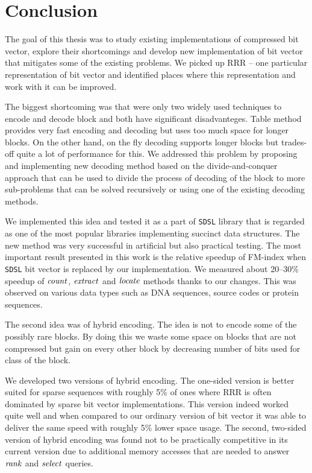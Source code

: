 \chapter*{Conclusion}  %

The goal of this thesis was to study existing implementations of compressed
bit vector, explore their shortcomings and develop new implementation of bit
vector that mitigates some of the existing problems. We picked up RRR -- one
particular representation of bit vector and identified places where this
representation and work with it can be improved. 

The biggest shortcoming was that were only two widely used techniques to
encode and decode block and both have significant disadvanteges. Table method
provides very fast encoding and decoding but uses too much space for longer
blocks. On the other hand, on the fly decoding supports longer blocks but
trades-off quite a lot of performance for this. We addressed this problem by
proposing and implementing new decoding method based on the divide-and-conquer
approach that can be used to divide the process of decoding of the block to more
sub-problems that can be solved recursively or using one of the existing decoding
methods.

We implemented this idea and tested it as a part of \texttt{SDSL} library that is
regarded as one of the most popular libraries implementing succinct data structures.
The new method was very successful in artificial but also practical testing. The most
important result presented in this work is the relative speedup of FM-index when
\texttt{SDSL} bit vector is replaced by our implementation. We measured about 20--30\%
speedup of $\mathit{count}$, $\mathit{extract}$ and $\mathit{locate}$ methods thanks to our changes. This
was observed on various data types such as DNA sequences, source codes or protein sequences.

The second idea was of hybrid encoding. The idea is not to encode some of the possibly rare
blocks. By doing this we waste some space on blocks that are not compressed but gain
on every other block by decreasing number of bits used for class of the block.

We developed two versions of hybrid encoding. The one-sided version is better
suited for sparse sequences with roughly 5\% of ones where RRR is often dominated by sparse
bit vector implementations. This version indeed worked quite well and when compared to our
ordinary version of bit vector it was able to deliver the same
speed with roughly 5\% lower space usage. The second, two-sided version of hybrid encoding
was found not to be practically competitive in its current version due to additional memory
accesses that are needed to answer $\mathit{rank}$ and $\mathit{select}$ queries. 

